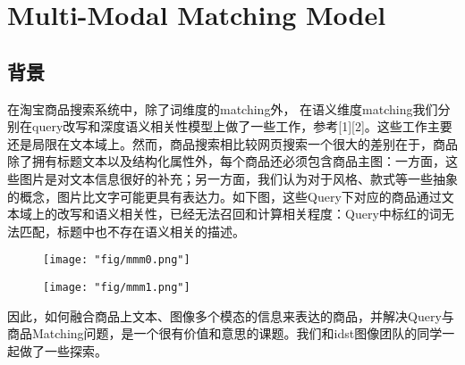 \section{Multi-Modal Matching Model}
\subsection{背景}
在淘宝商品搜索系统中，除了词维度的matching外， 在语义维度matching我们分别在query改写和深度语义相关性模型上做了一些工作，参考[1][2]。这些工作主要还是局限在文本域上。然而，商品搜索相比较网页搜索一个很大的差别在于，商品除了拥有标题文本以及结构化属性外，每个商品还必须包含商品主图：一方面，这些图片是对文本信息很好的补充；另一方面，我们认为对于风格、款式等一些抽象的概念，图片比文字可能更具有表达力。如下图，这些Query下对应的商品通过文本域上的改写和语义相关性，已经无法召回和计算相关程度：Query中标红的词无法匹配，标题中也不存在语义相关的描述。          
\begin{figure}[!h]
	\centering
	\texttt{[image: "fig/mmm0.png"]}
	\caption{}
	\label{fig:mmm0}
\end{figure}
\begin{figure}[!h]
	\centering
	\texttt{[image: "fig/mmm1.png"]}
	\caption{}
	\label{fig:mmm1}
\end{figure}



因此，如何融合商品上文本、图像多个模态的信息来表达的商品，并解决Query与商品Matching问题，是一个很有价值和意思的课题。我们和idst图像团队的同学一起做了一些探索。
